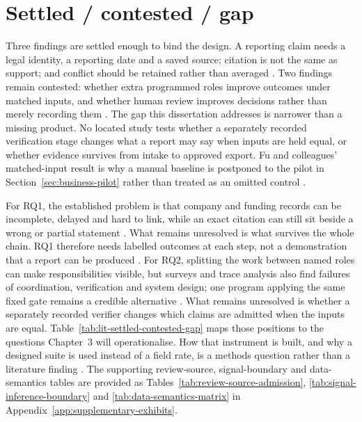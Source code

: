 \section{Settled / contested / gap}

Three findings are settled enough to bind the design. A reporting claim needs a legal identity,
a reporting date and a saved source; citation is not the same as support; and conflict should
be retained rather than averaged
\citep{buneman2001provenance,gao2023alce,kaplan2016vcdata}. Two findings
remain contested: whether extra programmed roles improve outcomes under matched inputs, and
whether human review improves decisions rather than merely recording them
\citep{fu2026agents,amershi2019guidelines,bucinca2021forcing}. The gap this dissertation
addresses is narrower than a missing product. No located study tests whether a separately
recorded verification stage changes what a report may say when inputs are held equal, or
whether evidence survives from intake to approved export. Fu and colleagues' matched-input
result is why a manual baseline is postponed to the pilot in
Section~\ref{sec:business-pilot} rather than treated as an omitted control
\citep{fu2026agents,peffers2007dsrm}.

For RQ1, the established problem is that company and funding records can be incomplete, delayed
and hard to link, while an exact citation can still sit beside a wrong or partial statement
\citep{thorne2026funding,kaplan2016vcdata,gao2023rarr}. What remains unresolved is what survives
the whole chain. RQ1 therefore needs labelled outcomes at each step, not a demonstration that a
report can be produced \citep{nikiforova2020quality,pineau2021reproducibility}. For RQ2, splitting
the work between named roles can make responsibilities visible, but surveys and trace analysis
also find failures of coordination, verification and system design; one program applying the
same fixed gate remains a credible alternative \citep{guo2024multiagent,cemri2025masfailures}.
What remains unresolved is whether a separately recorded verifier changes which claims are
admitted when the inputs are equal. Table~\ref{tab:lit-settled-contested-gap} maps those
positions to the questions Chapter~3 will operationalise. How that instrument is built, and why
a designed suite is used instead of a field rate, is a methods question rather than a literature
finding \citep{hevner2004design,peffers2007dsrm}.
The supporting review-source, signal-boundary and data-semantics tables are provided as
Tables~\ref{tab:review-source-admission}, \ref{tab:signal-inference-boundary} and
\ref{tab:data-semantics-matrix} in Appendix~\ref{app:supplementary-exhibits}.


